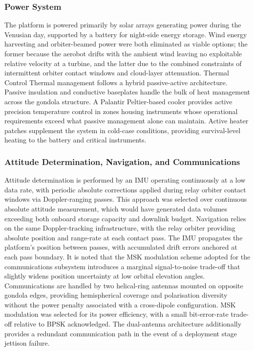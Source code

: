 \subsubsection*{Power System}
The platform is powered primarily by solar arrays generating power during the Venusian day, supported by a battery for night-side energy storage. Wind energy harvesting and orbiter-beamed power were both eliminated as viable options; the former because the aerobot drifts with the ambient wind leaving no exploitable relative velocity at a turbine, and the latter due to the combined constraints of intermittent orbiter contact windows and cloud-layer attenuation.
Thermal Control
Thermal management follows a hybrid passive-active architecture. Passive insulation and conductive baseplates handle the bulk of heat management across the gondola structure. A Palantir Peltier-based cooler provides active precision temperature control in zones housing instruments whose operational requirements exceed what passive management alone can maintain. Active heater patches supplement the system in cold-case conditions, providing survival-level heating to the battery and critical instruments.

\subsubsection*{Attitude Determination, Navigation, and Communications}
Attitude determination is performed by an IMU operating continuously at a low data rate, with periodic absolute corrections applied during relay orbiter contact windows via Doppler-ranging passes. This approach was selected over continuous absolute attitude measurement, which would have generated data volumes exceeding both onboard storage capacity and downlink budget.
Navigation relies on the same Doppler-tracking infrastructure, with the relay orbiter providing absolute position and range-rate at each contact pass. The IMU propagates the platform's position between passes, with accumulated drift errors anchored at each pass boundary. It is noted that the MSK modulation scheme adopted for the communications subsystem introduces a marginal signal-to-noise trade-off that slightly widens position uncertainty at low orbital elevation angles.
Communications are handled by two helical-ring antennas mounted on opposite gondola edges, providing hemispherical coverage and polarisation diversity without the power penalty associated with a cross-dipole configuration. MSK modulation was selected for its power efficiency, with a small bit-error-rate trade-off relative to BPSK acknowledged. The dual-antenna architecture additionally provides a redundant communication path in the event of a deployment stage jettison failure.


